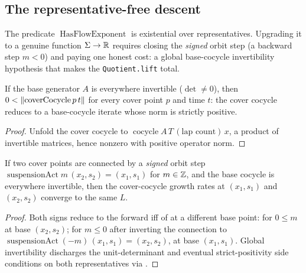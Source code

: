 \subsection{The representative-free descent}

The predicate $\operatorname{HasFlowExponent}$ is existential over representatives. Upgrading it to
a genuine function $\Sigma \to \mathbb{R}$ requires closing the \emph{signed} orbit step (a backward step
$m < 0$) and paying one honest cost: a global base-cocycle invertibility hypothesis that makes the
\texttt{Quotient.lift} total.

\begin{lemma}\label{thm:susp-normPos}
  \leanok
  If the base generator $A$ is everywhere invertible ($\det \ne 0$), then
  $0 < \left\lVert \operatorname{coverCocycle} p\,t \right\rVert$ for every cover point $p$ and time $t$: the cover
  cocycle reduces to a base-cocycle iterate whose norm is strictly positive.
\end{lemma}
\begin{proof}\leanok
  Unfold the cover cocycle to $\operatorname{cocycle} A\,T\,(\text{lap count})\,x$, a product of
  invertible matrices, hence nonzero with positive operator norm.
\end{proof}

\begin{theorem}\label{thm:susp-iffSigned}
  \leanok
  If two cover points are connected by a \emph{signed} orbit step
  $\operatorname{suspensionAct} m\,(x_2, s_2) = (x_1, s_1)$ for $m \in \mathbb{Z}$, and the base cocycle is
  everywhere invertible, then the cover-cocycle growth rates at $(x_1, s_1)$ and $(x_2, s_2)$
  converge to the same $L$.
\end{theorem}
\begin{proof}\leanok
  Both signs reduce to the forward iff of  at a different base point:
  for $0 \le m$ at base $(x_2, s_2)$; for $m \le 0$ after inverting the connection to
  $\operatorname{suspensionAct}(-m)\,(x_1, s_1) = (x_2, s_2)$, at base $(x_1, s_1)$. Global
  invertibility discharges the unit-determinant and eventual strict-positivity side conditions on
  both representatives via .
\end{proof}

